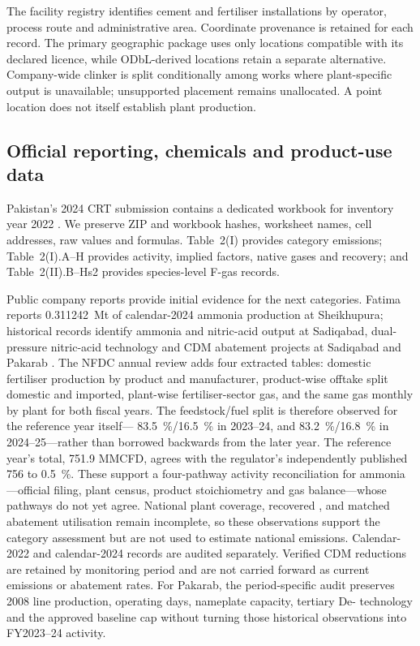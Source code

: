 The facility registry identifies cement and fertiliser installations by operator, process route and administrative area. Coordinate provenance is retained for each record. The primary geographic package uses only locations compatible with its declared licence, while ODbL-derived locations retain a separate alternative. Company-wide clinker is split conditionally among works where plant-specific output is unavailable; unsupported placement remains unallocated. A point location does not itself establish plant production.

\subsection{Official reporting, chemicals and product-use data}

Pakistan's 2024 CRT submission contains a dedicated workbook for inventory year 2022
\citep{pakcrt2026}. We preserve ZIP and workbook hashes, worksheet names, cell addresses, raw
values and formulas. Table~2(I) provides category emissions; Table~2(I).A--H provides
activity, implied factors, native gases and recovery; and Table~2(II).B--Hs2 provides
species-level F-gas records.

Public company reports provide initial evidence for the next categories. Fatima
reports \SI{0.311242}{\mega\tonne} of calendar-2024 ammonia production at Sheikhupura; historical
records identify ammonia and nitric-acid output at Sadiqabad, dual-pressure nitric-acid
technology and CDM abatement projects at Sadiqabad and Pakarab \citep{fatima2024,pakarabcdm,
fatimacdm}. The NFDC annual review adds four extracted tables: domestic fertiliser production
by product and manufacturer, product-wise offtake split domestic and imported, plant-wise
fertiliser-sector gas, and the same gas monthly by plant for both fiscal years. The
feedstock/fuel split is therefore observed for the reference year itself---
\SI{83.5}{\percent}/\SI{16.5}{\percent} in 2023--24, and
\SI{83.2}{\percent}/\SI{16.8}{\percent} in 2024--25---rather than borrowed backwards from
the later year. The reference year's total, \SI{751.9}{} MMCFD, agrees with the
regulator's independently published \SI{756}{} to \SI{0.5}{\percent}. These
support a four-pathway activity reconciliation for ammonia---official filing, plant census,
product stoichiometry and gas balance---whose pathways do not yet agree. National plant
coverage, recovered \COtwo{}, and matched abatement utilisation
remain incomplete, so these observations support the category assessment but are not used to
estimate national emissions. Calendar-2022
and calendar-2024 records are audited separately. Verified CDM reductions are retained by
monitoring period and are not carried forward as current \NtwoO{} emissions or abatement rates.
For Pakarab, the period-specific audit preserves 2008 line production, operating days,
nameplate capacity, tertiary De-\NtwoO{} technology and the approved baseline cap without
turning those historical observations into FY2023--24 activity.

